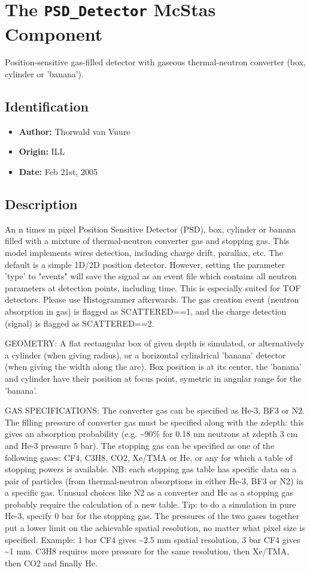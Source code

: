 \section{The \texttt{PSD\_Detector} McStas Component}
Position-sensitive gas-filled detector with gaseous thermal-neutron
converter (box, cylinder or 'banana').

\subsection*{Identification}
\begin{itemize}
  \item \textbf{Author:} Thorwald van Vuure
  \item \textbf{Origin:} ILL
  \item \textbf{Date:} Feb 21st, 2005
\end{itemize}

\subsection*{Description}
An n times m pixel Position Sensitive Detector (PSD), box, cylinder or banana filled with a mixture of thermal-neutron converter gas and stopping gas. This model implements wires detection, including charge drift, parallax, etc. The default is a simple 1D/2D position detector. However, setting the parameter 'type' to "events" will save the signal as an event file which contains all neutron parameters at detection points, including time. This is especially suited for TOF detectors. Please use Histogrammer afterwards. The gas creation event (neutron absorption in gas) is flagged as SCATTERED==1, and the charge detection (signal) is flagged as SCATTERED==2.

GEOMETRY: A flat rectangular box of given depth is simulated, or alternatively a cylinder (when giving radius), or a horizontal cylindrical 'banana' detector (when giving the width along the arc). Box position is at its center, the 'banana' and cylinder have their position at focus point, symetric in angular range for the 'banana'.

GAS SPECIFICATIONS: The converter gas can be specified as He-3, BF3 or N2. The filling pressure of converter gas must be specified along with the zdepth: this gives an absorption probability (e.g. \textasciitilde{}90\% for 0.18 nm neutrons at zdepth 3 cm and He-3 pressure 5 bar). The stopping gas can be specified as one of the following gases: CF4, C3H8, CO2, Xe/TMA or He, or any for which a table of stopping powers is available. NB: each stopping gas table has specific data on a pair of particles (from thermal-neutron absorptions in either He-3, BF3 or N2) in a specific gas. Unusual choices like N2 as a converter and He as a stopping gas probably require the calculation of a new table. Tip: to do a simulation in pure He-3, specify 0 bar for the stopping gas. The pressures of the two gases together put a lower limit on the achievable spatial resolution, no matter what pixel size is specified. Example: 1 bar CF4 gives \textasciitilde{}2.5 mm spatial resolution, 3 bar CF4 gives \textasciitilde{}1 mm. C3H8 requires more pressure for the same resolution, then Xe/TMA, then CO2 and finally He.

